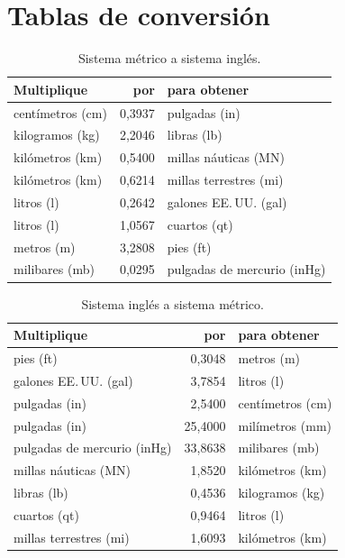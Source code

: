 \chapter{Tablas de conversión}
\label{ap:conversiones}


\begin{table}[htbp]
\centering\small
\caption{Sistema métrico a sistema inglés.}
\begin{tabular}{@{}lrl@{}}
\toprule
Multiplique & por & para obtener \\
\midrule
centímetros (cm) & 0,3937 & pulgadas (in) \\
kilogramos (kg) & 2,2046 & libras (lb) \\
kilómetros (km) & 0,5400 & millas náuticas (MN) \\
kilómetros (km) & 0,6214 & millas terrestres (mi) \\
litros (l) & 0,2642 & galones EE.\,UU. (gal) \\
litros (l) & 1,0567 & cuartos (qt) \\
metros (m) & 3,2808 & pies (ft) \\
milibares (mb) & 0,0295 & pulgadas de mercurio (inHg) \\
\bottomrule
\end{tabular}
\end{table}

\begin{table}[htbp]
\centering\small
\caption{Sistema inglés a sistema métrico.}
\begin{tabular}{@{}lrl@{}}
\toprule
Multiplique & por & para obtener \\
\midrule
pies (ft) & 0,3048 & metros (m) \\
galones EE.\,UU. (gal) & 3,7854 & litros (l) \\
pulgadas (in) & 2,5400 & centímetros (cm) \\
pulgadas (in) & 25,4000 & milímetros (mm) \\
pulgadas de mercurio (inHg) & 33,8638 & milibares (mb) \\
millas náuticas (MN) & 1,8520 & kilómetros (km) \\
libras (lb) & 0,4536 & kilogramos (kg) \\
cuartos (qt) & 0,9464 & litros (l) \\
millas terrestres (mi) & 1,6093 & kilómetros (km) \\
\bottomrule
\end{tabular}
\end{table}


